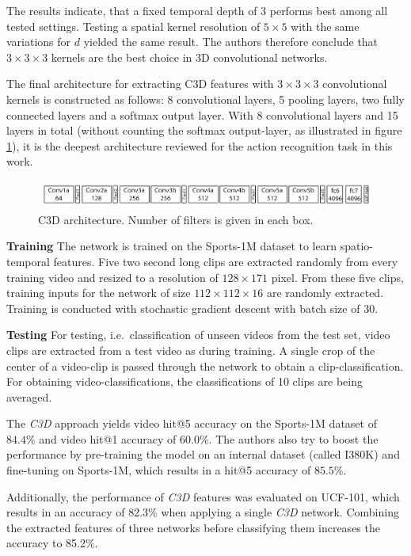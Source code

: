 The results indicate, that a fixed temporal depth of 3 performs best among all tested settings.
Testing a spatial kernel resolution of $5\times5$ with the same variations for $d$ yielded the same result.
The authors therefore conclude that $3\times3\times3$ kernels are the best choice in 3D convolutional networks.

The final architecture for extracting C3D features with $3\times3\times3$ convolutional kernels is constructed as follows:
8 convolutional layers, 5 pooling layers, two fully connected layers and a softmax output layer.
With 8 convolutional layers and 15 layers in total (without counting the softmax output-layer, as illustrated in figure \ref{fig:c3d_architecture}), it is the deepest architecture reviewed for the action recognition task in this work.
\begin{figure}[H]
    \centering
    \includegraphics[width=\textwidth]{img_deep/c3d_architecture}
    \caption{C3D architecture. Number of filters is given in each box. \cite{tran_learning_2015}}
    \label{fig:c3d_architecture}
\end{figure}

\textbf{Training} The network is trained on the Sports-1M \cite{karpathy_large-scale_2014} dataset to learn spatio-temporal features.
Five two second long clips are extracted randomly from every training video and resized to a resolution of $128\times171$ pixel.
From these five clips, training inputs for the network of size $112\times112\times16$ are randomly extracted.
Training is conducted with stochastic gradient descent with batch size of 30.

\textbf{Testing} For testing, i.e.\ classification of unseen videos from the test set, video clips are extracted from a test video as during training.
A single crop of the center of a video-clip is passed through the network to obtain a clip-classification.
For obtaining video-classifications, the classifications of 10 clips are being averaged.

The \textit{C3D} approach yields video hit@5 accuracy on the Sports-1M dataset of $84.4\%$ and video hit@1 accuracy of $60.0\%$.
The authors also try to boost the performance by pre-training the model on an internal dataset (called I380K) and fine-tuning on Sports-1M, which results in a hit@5 accuracy of $85.5\%$.

Additionally, the performance of \textit{C3D} features was evaluated on UCF-101, which results in an accuracy of 82.3\% when applying a single \textit{C3D} network.
Combining the extracted features of three networks before classifying them increases the accuracy to 85.2\%.

